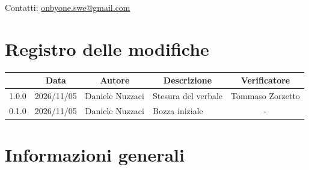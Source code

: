 \documentclass[11pt, a4paper]{article}
\begin{document}
\begin{titlepage}
    \vspace{0.5cm}
    
    {\large Contatti: \href{mailto:onbyone.swe@gmail.com}{onbyone.swe@gmail.com} }
    
\end{titlepage}

\newpage

\section*{Registro delle modifiche}

\vspace{1cm}
\begin{center}
    \renewcommand{\arraystretch}{1.5}
    \begin{tabularx}{\textwidth}{|c|c|c|X|c|}
        \hline
        \rowcolor{gray!10} 
        \multicolumn{1}{|c|}{\textbf{Versione}} & 
        \multicolumn{1}{c|}{\textbf{Data}} & 
        \multicolumn{1}{c|}{\textbf{Autore}} & 
        \multicolumn{1}{c|}{\textbf{Descrizione}} & 
        \multicolumn{1}{c|}{\textbf{Verificatore}} \\
        \hline
        1.0.0 & 2026/11/05 & Daniele Nuzzaci & Stesura del verbale & Tommaso Zorzetto \\
        \hline
        0.1.0 & 2026/11/05 & Daniele Nuzzaci & Bozza iniziale & - \\
        \hline
    \end{tabularx}
\end{center}
\vfill
\newpage

\tableofcontents
\newpage

\section{Informazioni generali}
\end{document}
